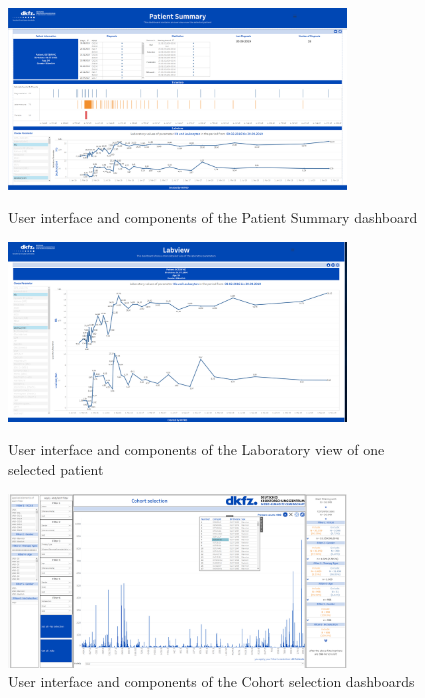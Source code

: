 \documentclass[aac]{iosart2x}
\begin{document}
\begin{figure}[HT]
\centering
\includegraphics[width=0.8\textwidth]{images/Pat sum.png}
\caption{User interface and components of the Patient Summary dashboard}\label{f2}
\includegraphics[width=0.8\textwidth]{images/Labview.png}
\caption{User interface and components of the Laboratory view of one selected patient}\label{f3}
\includegraphics[width=0.8\textwidth]{images/ch sel.png}
\caption{User interface and components of the Cohort selection dashboards}\label{f4}
\end{figure}
\end{document}

